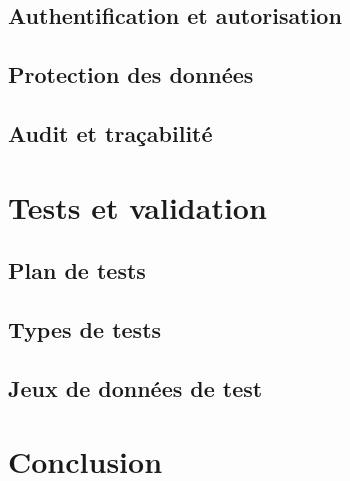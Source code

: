 
\subsection{Authentification et autorisation}


\subsection{Protection des données}


\subsection{Audit et traçabilité}


\section{Tests et validation}


\subsection{Plan de tests}


\subsection{Types de tests}


\subsection{Jeux de données de test}


\section{Conclusion}

